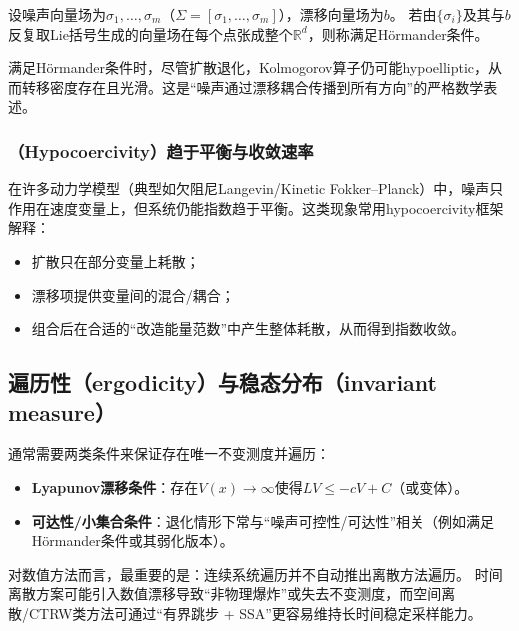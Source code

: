 	\begin{definition}[H\"ormander括号生成条件]
		
		设噪声向量场为$\sigma_1,\dots,\sigma_m$（$\Sigma=[\sigma_1,\dots,\sigma_m]$），漂移向量场为$b$。
		若由$\{\sigma_i\}$及其与$b$反复取Lie括号生成的向量场在每个点张成整个$\mathbb{R}^d$，则称满足H\"ormander条件。
	\end{definition}
	

	满足H\"ormander条件时，尽管扩散退化，Kolmogorov算子仍可能hypoelliptic，从而转移密度存在且光滑。这是“噪声通过漂移耦合传播到所有方向”的严格数学表述。

	
	\subsubsection{（Hypocoercivity）趋于平衡与收敛速率}
	
	在许多动力学模型（典型如欠阻尼Langevin/Kinetic Fokker--Planck）中，噪声只作用在速度变量上，但系统仍能指数趋于平衡。这类现象常用hypocoercivity框架解释：
	
	\begin{itemize} %
		
		\item 扩散只在部分变量上耗散；
		
		\item 漂移项提供变量间的混合/耦合；
		
		\item 组合后在合适的“改造能量范数”中产生整体耗散，从而得到指数收敛。
		
	\end{itemize}
	
	\subsection{遍历性（ergodicity）与稳态分布（invariant measure）}
	
	通常需要两类条件来保证存在唯一不变测度并遍历：
	\begin{itemize} %
		\item \textbf{Lyapunov漂移条件}：存在$V(x)\to\infty$使得$LV\le -cV + C$（或变体）。
		\item \textbf{可达性/小集合条件}：退化情形下常与“噪声可控性/可达性”相关（例如满足H\"ormander条件或其弱化版本）。
	\end{itemize}
	
		对数值方法而言，最重要的是：连续系统遍历并不自动推出离散方法遍历。
		时间离散方案可能引入数值漂移导致“非物理爆炸”或失去不变测度，而空间离散/CTRW类方法可通过“有界跳步 + SSA”更容易维持长时间稳定采样能力。

